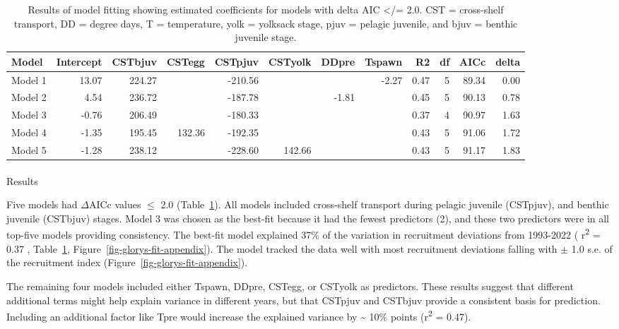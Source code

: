 \documentclass[
  english,
]{article}
\makeatletter
\let\oldparagraph\paragraph
\renewcommand{\paragraph}{
    \@ifstar
      \xxxParagraphStar
      \xxxParagraphNoStar
  }
\newcommand{\xxxParagraphStar}[1]{\oldparagraph*{#1}\mbox{}}
\newcommand{\xxxParagraphNoStar}[1]{\oldparagraph{#1}\mbox{}}
\makeatother
\begin{document}
\begingroup
\fontsize{8.0pt}{9.0pt}\selectfont

\begin{longtable}{lrrrrrrrrrrr}

\caption{\label{tbl-aic-appendix}Results of model fitting showing
estimated coefficients for models with delta AIC \textless/= 2.0. CST =
cross-shelf transport, DD = degree days, T = temperature, yolk =
yolksack stage, pjuv = pelagic juvenile, and bjuv = benthic juvenile
stage.}

\tabularnewline

\toprule
Model & Intercept & CSTbjuv & CSTegg & CSTpjuv & CSTyolk & DDpre & Tspawn & R2 & df & AICc & delta \\ 
\midrule\addlinespace[2.5pt]
Model 1 & 13.07 & 224.27 &  & -210.56 &  &  & -2.27 & 0.47 & 5 & 89.34 & 0.00 \\ 
Model 2 & 4.54 & 236.72 &  & -187.78 &  & -1.81 &  & 0.45 & 5 & 90.13 & 0.78 \\ 
Model 3 & -0.76 & 206.49 &  & -180.33 &  &  &  & 0.37 & 4 & 90.97 & 1.63 \\ 
Model 4 & -1.35 & 195.45 & 132.36 & -192.35 &  &  &  & 0.43 & 5 & 91.06 & 1.72 \\ 
Model 5 & -1.28 & 238.12 &  & -228.60 & 142.66 &  &  & 0.43 & 5 & 91.17 & 1.83 \\ 
\bottomrule

\end{longtable}

\endgroup

\paragraph{Results}\label{results}

Five models had \(\Delta\)AICc values \(\le\) 2.0
(Table~\ref{tbl-aic-appendix}). All models included cross-shelf
transport during pelagic juvenile (CSTpjuv), and benthic juvenile
(CSTbjuv) stages. Model 3 was chosen as the best-fit because it had the
fewest predictors (2), and these two predictors were in all top-five
models providing consistency. The best-fit model explained 37\% of the
variation in recruitment deviations from 1993-2022 (
r\textsuperscript{2} = 0.37 , Table~\ref{tbl-aic-appendix},
Figure~\ref{fig-glorys-fit-appendix}). The model tracked the data well
with most recruitment deviations falling with \(\pm\) 1.0 s.e. of the
recruitment index (Figure~\ref{fig-glorys-fit-appendix}).

The remaining four models included either Tspawn, DDpre, CSTegg, or
CSTyolk as predictors. These results suggest that different additional
terms might help explain variance in different years, but that CSTpjuv
and CSTbjuv provide a consistent basis for prediction. Including an
additional factor like Tpre would increase the explained variance by
\textasciitilde{} 10\% points (r\textsuperscript{2} = 0.47).
\end{document}
